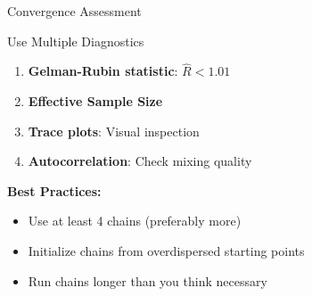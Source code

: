 \begin{frame}{Convergence Assessment}
	\begin{block}{Use Multiple Diagnostics}
		\begin{enumerate}
			\item \textbf{Gelman-Rubin statistic}: $\hat{R} < 1.01$
			\item \textbf{Effective Sample Size}
			\item \textbf{Trace plots}: Visual inspection
			\item \textbf{Autocorrelation}: Check mixing quality
		\end{enumerate}
	\end{block}

	\vspace{0.5cm}
	\textbf{Best Practices:}
	\begin{itemize}
		\item Use at least 4 chains (preferably more)
		\item Initialize chains from overdispersed starting points
		\item Run chains longer than you think necessary
	\end{itemize}
\end{frame}
